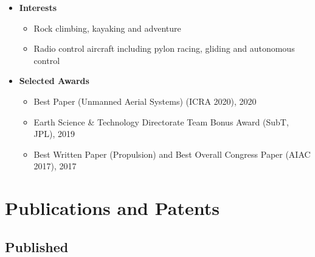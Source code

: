 \documentclass[12pt,letter,sans]{moderncv}
\begin{document}
\begin{itemize}

\vspace{4pt}

\item
{
    \textbf{Interests}
        \vspace{3pt} 
        \begin{itemize}
            \item Rock climbing, kayaking and adventure
            \item Radio control aircraft including pylon racing, gliding and autonomous control
        \end{itemize}
}

\vspace{4pt}
   
\item
{
    \textbf{Selected Awards}
        \vspace{3pt} 
        \begin{itemize}
            \item Best Paper (Unmanned Aerial Systems) (ICRA 2020), 2020
            \item Earth Science \& Technology Directorate Team Bonus Award (SubT, JPL), 2019
            \item Best Written Paper (Propulsion) and Best Overall Congress Paper (AIAC 2017), 2017
        \end{itemize}
}    
    
\end{itemize}

\newpage

\section{Publications and Patents}
\subsection{Published}
\end{document}

